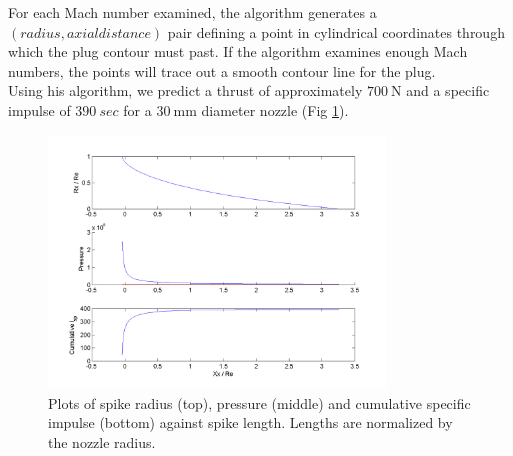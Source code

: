 \documentclass{article}
\begin{document}
For each Mach number examined, the algorithm generates a $(radius, axial distance)$ pair defining a point in cylindrical coordinates through which the plug contour must past. If the algorithm examines enough Mach numbers, the points will trace out a smooth contour line for the plug.\\
Using his algorithm, we predict a thrust of approximately $\SI{700}{\newton}$ and a specific impulse of $\SI{390}{sec}$ for a $\SI{30}{\milli\metre}$ diameter nozzle (Fig \ref{spike_contour}).
\begin{figure}[h!]
\centering
\includegraphics[width = 0.8\textwidth]{spike_contour.png}
\caption{Plots of spike radius (top), pressure (middle) and cumulative specific impulse (bottom) against spike length. Lengths are normalized by the nozzle radius.} 
\label{spike_contour}
\end{figure}
\end{document}
